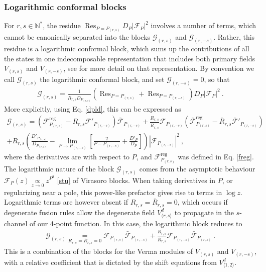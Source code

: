 \documentclass[12pt, a4paper]{article}
\theoremstyle{break}
\begin{document}
\subsubsection{Logarithmic conformal blocks}\label{sec:log}

For $r,s\in\mathbb{N}^*$, the residue $\operatorname{Res}_{P=P_{(r,s)}}D_P\left|\mathcal{F}_{P}\right|^2$ 
involves a number of terms, which cannot be canonically separated into the blocks 
$\mathcal{G}_{(r,s)}$ and $\mathcal{G}_{(r,-s)}$. Rather, this residue is a logarithmic conformal block, which sums up the contributions of all the states in one indecomposable representation that includes both primary fields $V_{(r,s)}$ and $V_{(r,-s)}$, see \cite{nr20} for more detail on that representation. By convention we call $\mathcal{G}_{(r,s)}$ the logarithmic conformal block, and set $\mathcal{G}_{(r,-s)}=0$, so that 
\begin{align}
 \mathcal{G}_{(r,s)} = \frac{1}{\bar R_{r,s} D_{P_{(r,s)}}} \left( \operatorname{Res}_{P=P_{(r,s)}} + \operatorname{Res}_{P=P_{(r,-s)}}\right)D_P\left|\mathcal{F}_{P}\right|^2 \ . 
\end{align}
More explicitly, using Eq. \eqref{dpld}, this can be expressed as 
\begin{multline}
  \mathcal{G}_{(r,s)} = \left(\mathcal{F}^\text{reg}_{P_{(r,s)}} -R_{r,s} \mathcal{F}'_{P_{(r,-s)}}\right) \bar{\mathcal{F}}_{P_{(r,-s)}} 
  + \frac{R_{r,s}}{\bar{R}_{r,s}} \mathcal{F}_{P_{(r,-s)}} \left(\bar{\mathcal{F}}^\text{reg}_{P_{(r,s)}} -\bar R_{r,s} \bar{\mathcal{F}}'_{P_{(r,-s)}}\right)
  \\
  + R_{r,s} \left( \frac{D'_{P_{(r,s)}}}{D_{P_{(r,s)}}} - \lim_{P\to P_{(r,-s)}}\left[\frac{2}{P-P_{(r,-s)}} +\frac{D'_P}{D_P}\right]\right)
  \left|\mathcal{F}_{P_{(r,-s)}}\right|^2 
  \ ,
\end{multline}
where the derivatives are with respect to $P$, and
$\mathcal{F}^\text{reg}_{P_{(r,s)}}$ was defined in Eq. \eqref{freg}.
The logarithmic nature of the block $\mathcal{G}_{(r,s)}$ comes from the asymptotic behaviour $\mathcal{F}_P(z)\underset{z\to 0}{\propto} z^{P^2} $ \eqref{stu} of Virasoro blocks. When taking derivatives in $P$, or regularizing near a pole, this power-like prefactor gives rise to terms in $\log z$. Logarithmic terms are however absent if $R_{r,s}=\bar R_{r,s}=0$, which occurs if degenerate fusion rules allow the degenerate field $V^d_{\langle r,s\rangle}$ to propagate in the $s$-channel of our 4-point function. In this case, the logarithmic block reduces to 
\begin{align}
 \mathcal{G}_{(r,s)} \underset{R_{r,s}=\bar R_{r,s}=0}{=} 
 \mathcal{F}_{P_{(r,s)}}  \bar{\mathcal{F}}_{P_{(r,-s)}} + 
 \frac{R_{r,s}}{\bar{R}_{r,s}} \mathcal{F}_{P_{(r,-s)}} \bar{\mathcal{F}}_{P_{(r,s)}} \ .
\end{align}
This is a combination of the blocks for the Verma modules of $V_{(r,s)}$ and $V_{(r,-s)}$, with a relative coefficient that is dictated by the shift equations from $V^d_{\langle 1,2\rangle}$. 
\end{document}
